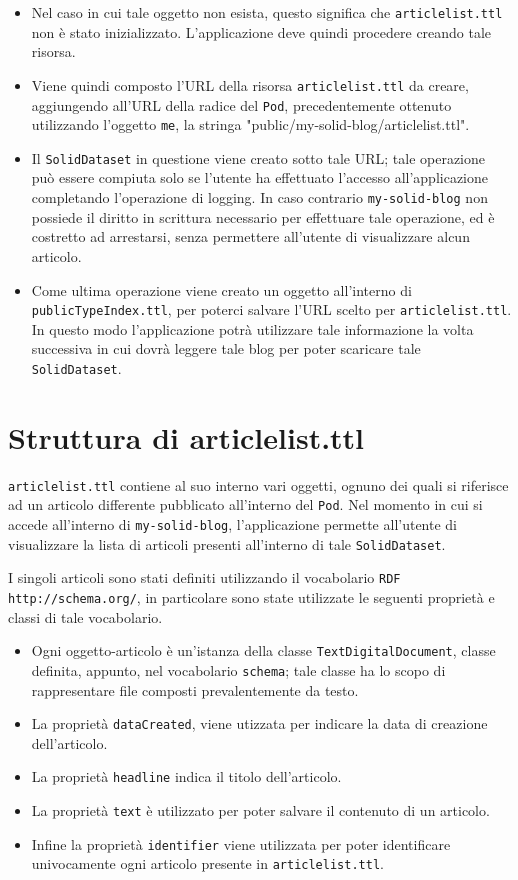 \begin{itemize}
	\item Nel caso in cui tale oggetto non esista, questo significa che {\tt articlelist.ttl} non è stato inizializzato. L'applicazione deve quindi procedere creando tale risorsa.
	\item Viene quindi composto l'URL della risorsa {\tt articlelist.ttl} da creare, aggiungendo all'URL della radice del {\tt Pod}, precedentemente ottenuto utilizzando l'oggetto {\tt me}, la stringa "public/my-solid-blog/articlelist.ttl".
	\item Il {\tt SolidDataset} in questione viene creato sotto tale URL; tale operazione può essere compiuta solo se l'utente ha effettuato l'accesso all'applicazione completando l'operazione di logging. In caso contrario {\tt my-solid-blog} non possiede il diritto in scrittura necessario per effettuare tale operazione, ed è costretto ad arrestarsi, senza permettere all'utente di visualizzare alcun articolo.
	\item Come ultima operazione viene creato un oggetto all'interno di {\tt publicTypeIndex.ttl}, per poterci salvare l'URL scelto per {\tt articlelist.ttl}. In questo modo l'applicazione potrà utilizzare tale informazione la volta successiva in cui dovrà leggere tale blog per poter scaricare tale {\tt SolidDataset}.
\end{itemize}

\bigskip

\section{Struttura di articlelist.ttl}

\medskip

{\tt articlelist.ttl} contiene al suo interno vari oggetti, ognuno dei quali si riferisce ad un articolo differente pubblicato all'interno del {\tt Pod}. Nel momento in cui si accede all'interno di {\tt my-solid-blog}, l'applicazione permette all'utente di visualizzare la lista di articoli presenti all'interno di tale {\tt SolidDataset}. 

\medskip

I singoli articoli sono stati definiti utilizzando il vocabolario {\tt RDF} {\tt http://schema.org/}, in particolare sono state utilizzate le seguenti proprietà e classi di tale vocabolario.

\begin{itemize}
	\item Ogni oggetto-articolo è un'istanza della classe {\tt TextDigitalDocument}, classe definita, appunto, nel vocabolario {\tt schema}; tale classe ha lo scopo di rappresentare file composti prevalentemente da testo.
	\item La proprietà {\tt dataCreated}, viene utizzata per indicare la data di creazione dell'articolo.
	\item La proprietà {\tt headline} indica il titolo dell'articolo.
	\item La proprietà {\tt text} è utilizzato per poter salvare il contenuto di un articolo.
	\item Infine la proprietà {\tt identifier} viene utilizzata per poter identificare univocamente ogni articolo presente in {\tt articlelist.ttl}.
\end{itemize}

